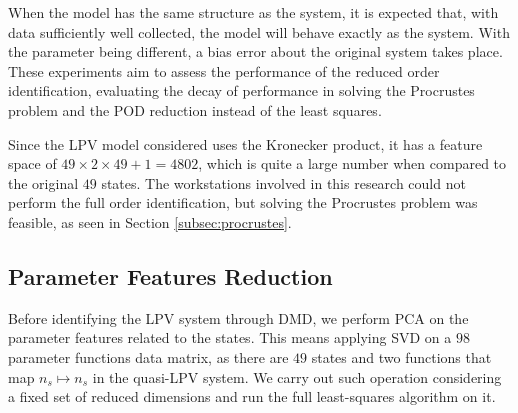 When the model has the same structure as the system, it is expected that, with data sufficiently well collected, the model will behave exactly as the system.
%
With the parameter being different, a bias error about the original system takes place.
%
These experiments aim to assess the performance of the reduced order identification, evaluating the decay of performance in solving the Procrustes problem and the POD reduction instead of the least squares.

Since the LPV model considered uses the Kronecker product, it has a feature space of $49\times 2\times 49 + 1 = 4802$, which is quite a large number when compared to the original $49$ states.
%
The workstations involved in this research could not perform the full order identification, but solving the Procrustes problem was feasible, as seen in Section \ref{subsec:procrustes}.
%


\color{blue}

\subsection{Parameter Features Reduction}

Before identifying the LPV system through DMD, we perform PCA on the parameter features related to the states.
%
This means applying SVD on a $98$ parameter functions data matrix, as there are $49$ states and two functions that map $n_s \mapsto n_s$ in the quasi-LPV system.
   We carry out such operation considering a fixed set of reduced dimensions and run the full least-squares algorithm on it.






